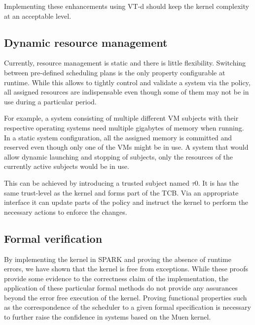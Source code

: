 Implementing these enhancements using VT-d should keep the kernel complexity at
an acceptable level.

\subsection{Dynamic resource management}
Currently, resource management is static and there is little flexibility.
Switching between pre-defined scheduling plans is the only property
configurable at runtime. While this allows to tightly control and validate a
system via the policy, all assigned resources are indispensable even though some
of them may not be in use during a particular period.

For example, a system consisting of multiple different VM subjects with their
respective operating systems need multiple gigabytes of memory when running.
In a static system configuration, all the assigned memory is committed and
reserved even though only one of the VMs might be in use. A system that would
allow dynamic launching and stopping of subjects, only the resources of the
currently active subjects would be in use.

This can be achieved by introducing a trusted subject named $\tau$0. It is has
the same trust-level as the kernel and forms part of the TCB. Via an appropriate
interface it can update parts of the policy and instruct the kernel to perform
the necessary actions to enforce the changes.

\subsection{Formal verification}
By implementing the kernel in SPARK and proving the absence of runtime errors,
we have shown that the kernel is free from exceptions. While these proofs
provide some evidence to the correctness claim of the implementation, the
application of these particular formal methods do not provide any assurances
beyond the error free execution of the kernel. Proving functional properties
such as the correspondence of the scheduler to a given formal specification is
necessary to further raise the confidence in systems based on the Muen kernel.
